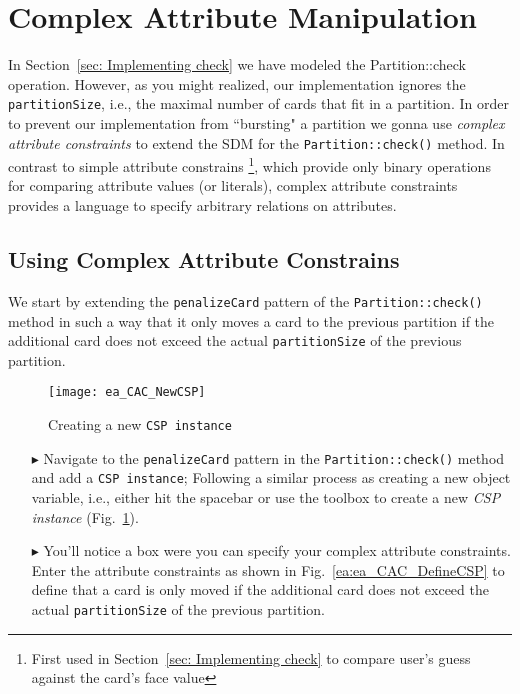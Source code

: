 \newpage
\section{Complex Attribute Manipulation}
\visHeader
In Section~\ref{sec: Implementing check} we have modeled the Partition::check operation.
However, as you might realized, our implementation ignores the \texttt{partitionSize}, i.e., the maximal number of cards that fit in a partition.
In order to prevent our implementation from ``bursting" a partition we gonna use \emph{complex attribute constraints} to extend the SDM for the \texttt{Partition::check()} method. 
In contrast to simple attribute constrains \footnote{First used in Section~\ref{sec: Implementing check} to compare user’s guess against the card's face value}, which provide only binary operations for comparing attribute values (or literals), complex attribute constraints provides a language to specify arbitrary relations on attributes.

\subsection{Using Complex Attribute Constrains}     
We start by extending the \texttt{penalizeCard} pattern of the \texttt{Partition::check()} method in such a way that it only moves a card to the previous partition if the additional card does not exceed the actual \texttt{partitionSize} of the previous partition.
\begin{figure}[htbp]
\begin{center}
  \texttt{[image: ea\_CAC\_NewCSP]}
  \caption{Creating a new \texttt{CSP instance}}  
  \label{ea:CAC_NewCSP}
\end{center}
\end{figure}
\begin{itemize}    

\item[$\blacktriangleright$] Navigate to the \texttt{penalizeCard} pattern in the \texttt{Partition::check()} method and add a \texttt{CSP instance};  
Following a similar process as creating a new object variable, i.e., either hit the spacebar or use the toolbox to create a new \emph{CSP instance} (Fig.~\ref{ea:CAC_NewCSP}).

\item[$\blacktriangleright$] You’ll notice a box were you can specify your complex attribute constraints. Enter the attribute constraints as shown in Fig.~\ref{ea:ea_CAC_DefineCSP} to define that a card is only moved if the additional card does not exceed the actual \texttt{partitionSize} of the previous partition.

\end{itemize}


